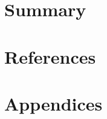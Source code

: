 \documentclass[letterpaper,12pt,sfdefaults=false]{scrreprt}
\begin{document}
\chapter{Summary}\label{ch:summary}


\chapter{References}\label{ch:references}
\printbibliography[heading=none,sorting=none]

\chapter{Appendices}\label{ch:appendices}\clearpage
\setcounter{section}{0}
\renewcommand\thesection{\Alph{section}}
\end{document}
